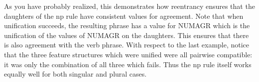 \documentclass[12pt]{report}
\begin{document}
\begin{enumerate}
As you have probably realized, this demonstrates 
how reentrancy ensures that the daughters of the np rule
have consistent values for agreement.
Note that when unification succeeds, the resulting
phrase has a value for NUMAGR which is the
unification of the values of NUMAGR on the daughters.
This ensures that there is also agreement with the verb phrase.
With respect to the last example, notice that
the three feature structures which were unified were all 
pairwise compatible: it was only the combination of
all three which fails.  Thus the np rule itself works
equally well for both singular and plural cases.


\end{enumerate}
\end{document}
